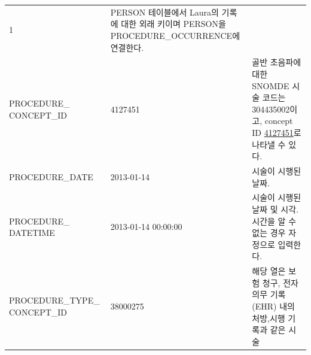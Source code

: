 \documentclass[10.5pt]{book}
\theoremstyle{definition}
\theoremstyle{definition}
\theoremstyle{definition}
\theoremstyle{remark}
\begin{document}
\begin{longtable}[]{@{}lll@{}}
\begin{minipage}[t]{0.16\columnwidth}
1\strut
\end{minipage} & \begin{minipage}[t]{0.48\columnwidth}\raggedright\strut
PERSON 테이블에서 Laura의 기록에 대한 외래 키이며 PERSON을
PROCEDURE\_OCCURRENCE에 연결한다.\strut
\end{minipage}\tabularnewline
\begin{minipage}[t]{0.28\columnwidth}\raggedright\strut
PROCEDURE\_ CONCEPT\_ID\strut
\end{minipage} & \begin{minipage}[t]{0.16\columnwidth}\raggedright\strut
4127451\strut
\end{minipage} & \begin{minipage}[t]{0.48\columnwidth}\raggedright\strut
골반 초음파에 대한 SNOMDE 시술 코드는 304435002이고, concept ID
\href{http://athena.ohdsi.org/search-terms/terms/4127451}{4127451}로
나타낼 수 있다.\strut
\end{minipage}\tabularnewline
\begin{minipage}[t]{0.28\columnwidth}\raggedright\strut
PROCEDURE\_DATE\strut
\end{minipage} & \begin{minipage}[t]{0.16\columnwidth}\raggedright\strut
2013-01-14\strut
\end{minipage} & \begin{minipage}[t]{0.48\columnwidth}\raggedright\strut
시술이 시행된 날짜.\strut
\end{minipage}\tabularnewline
\begin{minipage}[t]{0.28\columnwidth}\raggedright\strut
PROCEDURE\_ DATETIME\strut
\end{minipage} & \begin{minipage}[t]{0.16\columnwidth}\raggedright\strut
2013-01-14 00:00:00\strut
\end{minipage} & \begin{minipage}[t]{0.48\columnwidth}\raggedright\strut
시술이 시행된 날짜 및 시각. 시간을 알 수 없는 경우 자정으로
입력한다.\strut
\end{minipage}\tabularnewline
\begin{minipage}[t]{0.28\columnwidth}\raggedright\strut
PROCEDURE\_TYPE\_ CONCEPT\_ID\strut
\end{minipage} & \begin{minipage}[t]{0.16\columnwidth}\raggedright\strut
38000275\strut
\end{minipage} & \begin{minipage}[t]{0.48\columnwidth}\raggedright\strut
해당 열은 보험 청구, 전자 의무 기록(EHR) 내의 처방,시행 기록과 같은 시술

\end{minipage}
\end{longtable}
\end{document}
